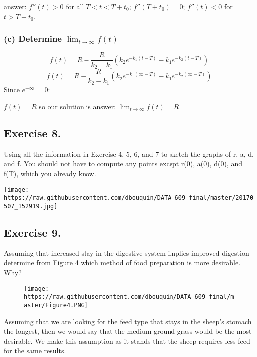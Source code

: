 \documentclass[]{article}
\begin{document}
answer: \(f''(t) > 0\) for all \(T < t < T + t_0\); \(f''(T + t_0) =0\);
\(f''(t) < 0\) for \(t > T + t_0\).

\subsubsection{\texorpdfstring{(c) Determine
\(\lim_{t\to\infty}f(t)\)}{(c) Determine \textbackslash{}lim\_\{t\textbackslash{}to\textbackslash{}infty\}f(t)}}\label{c-determine-lim_ttoinftyft}

\[f(t) = R - \frac{R}{k_2 - k_1}(k_2 e^{-k_1(t-T)}-k_1 e^{-k_2(t-T)})\]
\[f(t) = R - \frac{R}{k_2 - k_1}(k_2 e^{-k_1(\infty-T)}-k_1 e^{-k_2(\infty-T)})\]
Since \(e^{-\infty}\) = 0:

\(f(t) = R\) so our solution is answer: \(\lim_{t\to\infty}f(t) = R\)

\subsection{Exercise 8.}\label{exercise-8.}

Using all the information in Exercise 4, 5, 6, and 7 to sketch the
graphs of r, a, d, and f. You should not have to compute any points
except r(0), a(0), d(0), and f(T), which you already know.

\texttt{[image: https://raw.githubusercontent.com/dbouquin/DATA\_609\_final/master/20170507\_152919.jpg]}
\newpage

\subsection{Exercise 9.}\label{exercise-9.}

Assuming that increased stay in the digestive system implies improved
digestion determine from Figure 4 which method of food preparation is
more desirable. Why?

\begin{figure}[htbp]
\centering
\texttt{[image: https://raw.githubusercontent.com/dbouquin/DATA\_609\_final/master/Figure4.PNG]}
\caption{}
\end{figure}

Assuming that we are looking for the feed type that stays in the sheep's
stomach the longest, then we would say that the medium-ground grass
would be the most desirable. We make this assumption as it stands that
the sheep requires less feed for the same results.
\end{document}

